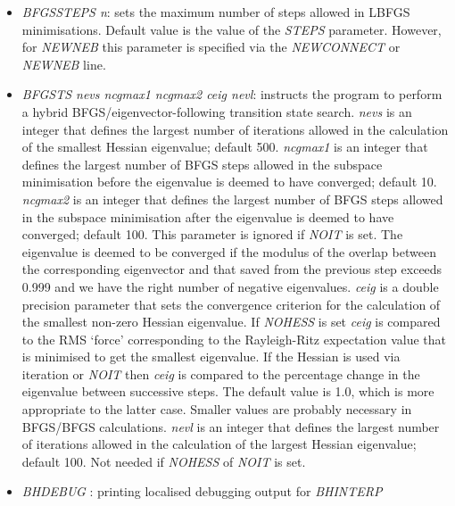 \documentclass[12pt,a4paper,dvips]{article}
\begin{document}
\begin{itemize}
\item {\it BFGSSTEPS n\/}: sets the maximum number of steps allowed in LBFGS minimisations.
Default value is the value of the {\it STEPS\/} parameter.
However, for {\it NEWNEB\/} this parameter is specified via the {\it NEWCONNECT} or
{\it NEWNEB\/} line.

\item {\it BFGSTS\/ nevs ncgmax1 ncgmax2 ceig nevl}: instructs the program to perform a
hybrid BFGS/eigenvector-following transition state search.
{\it nevs\/} is an integer that defines the largest number of iterations allowed in the
calculation of the smallest Hessian eigenvalue; default 500.
{\it ncgmax1\/} is an integer that defines the largest number of BFGS steps
allowed in the subspace minimisation before the eigenvalue is deemed to have converged; default 10.
{\it ncgmax2\/} is an integer that defines the largest number of BFGS steps
allowed in the subspace minimisation after the eigenvalue is deemed to have converged; default 100.
This parameter is ignored if {\it NOIT\/} is set.
The eigenvalue is deemed to be converged if the modulus of the overlap between the corresponding
eigenvector and that saved from the previous step exceeds 0.999 and we have the right number of
negative eigenvalues.
{\it ceig\/} is a double precision parameter that sets the convergence criterion for
the calculation of the smallest non-zero Hessian eigenvalue.
If {\it NOHESS\/} is set {\it ceig\/} is compared to the RMS `force' corresponding to the
Rayleigh-Ritz expectation value that is minimised to get the smallest eigenvalue.
If the Hessian is used via iteration or {\it NOIT\/}
then {\it ceig\/} is compared to the percentage change in the eigenvalue between successive
steps. The default value is 1.0, which is more appropriate to the latter case. Smaller
values are probably necessary in BFGS/BFGS calculations.
{\it nevl\/} is an integer that defines the largest number of iterations allowed in the
calculation of the largest Hessian eigenvalue; default 100. Not needed if {\it NOHESS\/}
of {\it NOIT\/} is set. 

\item {\it BHDEBUG\/ }: printing localised debugging output for {\it BHINTERP\/}
 

\end{itemize}
\end{document}

